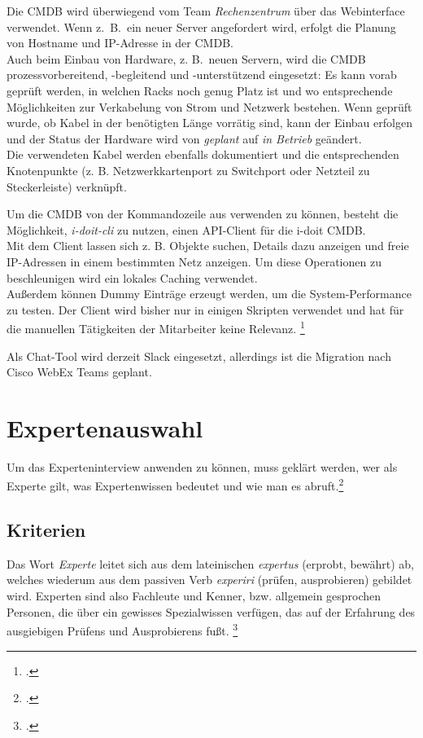 Die \acs{CMDB} wird überwiegend vom Team \textit{Rechenzentrum} über das Webinterface verwendet. Wenn z.~B.~ein neuer Server angefordert wird, erfolgt die Planung von Hostname und IP-Adresse in der \acs{CMDB}.\\
Auch beim Einbau von Hardware, z. B.~neuen Servern, wird die \acs{CMDB} prozessvorbereitend, -begleitend und -unterstützend eingesetzt: Es kann vorab geprüft werden, in welchen Racks noch genug Platz ist und wo entsprechende Möglichkeiten zur Verkabelung von Strom und Netzwerk bestehen. Wenn geprüft wurde, ob Kabel in der benötigten Länge vorrätig sind, kann der Einbau erfolgen und der Status der Hardware wird von \textit{geplant} auf \textit{in Betrieb} geändert.\\
Die verwendeten Kabel werden ebenfalls dokumentiert und die entsprechenden Knotenpunkte (z. B. Netzwerkkartenport zu Switchport oder Netzteil zu Steckerleiste) verknüpft.

Um die \acs{CMDB} von der Kommandozeile aus verwenden zu können, besteht die Möglichkeit, \textit{i-doit-cli} zu nutzen, einen \acf{API}-Client für die i-doit \acs{CMDB}.\\
Mit dem Client lassen sich z. B. Objekte suchen, Details dazu anzeigen und freie IP-Adressen in einem bestimmten Netz anzeigen. Um diese Operationen zu beschleunigen wird ein lokales Caching verwendet.\\
Außerdem können Dummy Einträge erzeugt werden, um die System-Performance zu testen. Der Client wird bisher nur in einigen Skripten verwendet und hat für die manuellen Tätigkeiten der Mitarbeiter keine Relevanz.
\footcite[Vgl.][o. \pno]{Heisig_2019_idoitcli}

Als Chat-Tool wird derzeit Slack eingesetzt, allerdings ist die Migration nach Cisco WebEx Teams geplant. 


\section{Expertenauswahl}
Um das Experteninterview anwenden zu können, muss geklärt werden, wer als Experte gilt, was Expertenwissen bedeutet und wie man es abruft.\footcite[Vgl.][6\psq]{Bogner_2014_Interview}

\subsection{Kriterien}
Das Wort \textit{Experte} leitet sich aus dem lateinischen \textit{expertus} (erprobt, bewährt) ab, welches wiederum aus dem passiven Verb \textit{experiri} (prüfen, ausprobieren) gebildet wird. Experten sind also Fachleute und Kenner, bzw. allgemein gesprochen Personen, die über ein gewisses Spezialwissen verfügen, das auf der Erfahrung des ausgiebigen Prüfens und Ausprobierens fußt. \footcite[Vgl.][9]{Bogner_2014_Interview}

